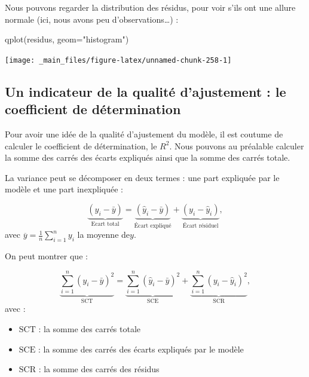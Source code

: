 \documentclass[
  11pt,
]{book}
\newenvironment{Shaded}{\begin{snugshade}}{\end{snugshade}}
\newcommand{\AttributeTok}[1]{\textcolor[rgb]{0.77,0.63,0.00}{#1}}
\newcommand{\FunctionTok}[1]{\textcolor[rgb]{0.00,0.00,0.00}{#1}}
\newcommand{\NormalTok}[1]{#1}
\newcommand{\StringTok}[1]{\textcolor[rgb]{0.31,0.60,0.02}{#1}}
\providecommand{\tightlist}{%
  \setlength{\itemsep}{0pt}\setlength{\parskip}{0pt}}
\numberwithin{equation}{section}
\numberwithin{countremarque}{section}
\begin{document}
Nous pouvons regarder la distribution des résidus, pour voir s'ils ont une allure normale (ici, nous avons peu d'observations\ldots) :

\begin{Shaded}
\begin{Highlighting}[]
\FunctionTok{qplot}\NormalTok{(residus, }\AttributeTok{geom=}\StringTok{"histogram"}\NormalTok{)}
\end{Highlighting}
\end{Shaded}

\begin{center}\texttt{[image: \_main\_files/figure-latex/unnamed-chunk-258-1]} \end{center}

\hypertarget{un-indicateur-de-la-qualituxe9-dajustement-le-coefficient-de-duxe9termination}{%
\subsection{Un indicateur de la qualité d'ajustement : le coefficient de détermination}\label{un-indicateur-de-la-qualituxe9-dajustement-le-coefficient-de-duxe9termination}}

Pour avoir une idée de la qualité d'ajustement du modèle, il est coutume de calculer le coefficient de détermination, le \(R^2\). Nous pouvons au préalable calculer la somme des carrés des écarts expliqués ainsi que la somme des carrés totale.

La variance peut se décomposer en deux termes : une part expliquée par le modèle et une part inexpliquée :

\[\underbrace{(y_i - \bar{y})}_{\text{Ecart total}} = \underbrace{(\hat{y}_i - \bar{y})}_{\text{Écart expliqué}} + \underbrace{(y_i - \hat{y}_i)}_{\text{Écart résiduel}},\]
avec \(\overline y = \frac{1}{n}\sum_{i=1}^{n} y_i\) la moyenne de\(y\).

On peut montrer que :

\[\underbrace{\sum_{i=1}^{n}(y_i - \bar{y})^2}_{\text{SCT}} = \underbrace{\sum_{i=1}^{n}(\hat{y}_i - \bar{y})^2}_{\text{SCE}} + \underbrace{\sum_{i=1}^{n}(y_i - \hat{y}_i)^2}_{\text{SCR}},\]
avec :

\begin{itemize}
\tightlist
\item
  \(\text{SCT}\) : la somme des carrés totale
\item
  \(\text{SCE}\) : la somme des carrés des écarts expliqués par le modèle
\item
  \(\text{SCR}\) : la somme des carrés des résidus
\end{itemize}
\end{document}
